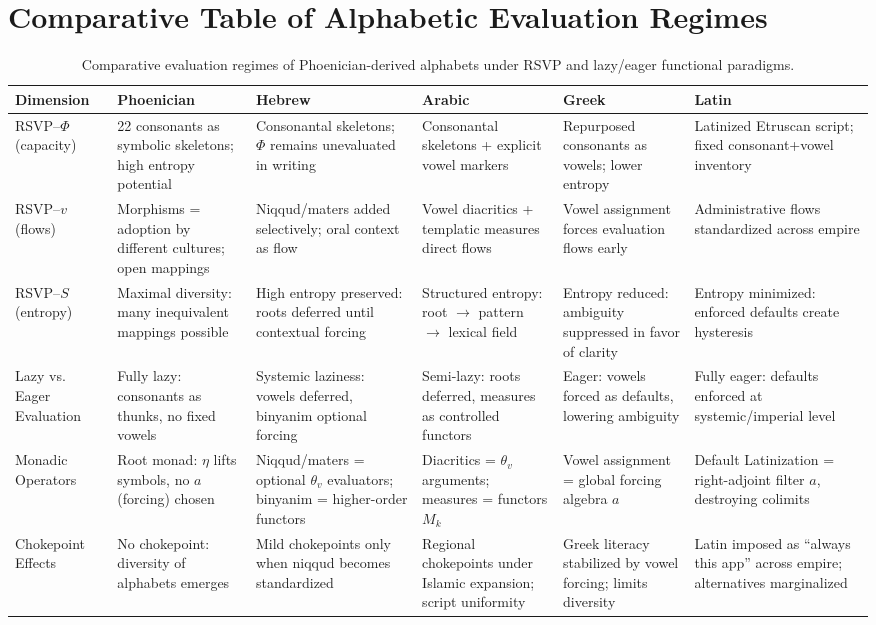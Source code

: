 \documentclass[12pt]{article}
\begin{document}
\section{Comparative Table of Alphabetic Evaluation Regimes}
\label{app:table}
\renewcommand{\arraystretch}{1.4}
\begin{table}[h!]
\centering
\begin{tabular}{l p{2.5cm} p{2.5cm} p{2.5cm} p{2.5cm} p{2.5cm}}
\toprule
Dimension & Phoenician & Hebrew & Arabic & Greek & Latin \\
\midrule
RSVP--$\Phi$ (capacity) & 22 consonants as symbolic skeletons; high entropy potential & Consonantal skeletons; $\Phi$ remains unevaluated in writing & Consonantal skeletons + explicit vowel markers & Repurposed consonants as vowels; lower entropy & Latinized Etruscan script; fixed consonant+vowel inventory \\
RSVP--$v$ (flows) & Morphisms = adoption by different cultures; open mappings & Niqqud/maters added selectively; oral context as flow & Vowel diacritics + templatic measures direct flows & Vowel assignment forces evaluation flows early & Administrative flows standardized across empire \\
RSVP--$S$ (entropy) & Maximal diversity: many inequivalent mappings possible & High entropy preserved: roots deferred until contextual forcing & Structured entropy: root $\to$ pattern $\to$ lexical field & Entropy reduced: ambiguity suppressed in favor of clarity & Entropy minimized: enforced defaults create hysteresis \\
Lazy vs. Eager Evaluation & Fully lazy: consonants as thunks, no fixed vowels & Systemic laziness: vowels deferred, binyanim optional forcing & Semi-lazy: roots deferred, measures as controlled functors & Eager: vowels forced as defaults, lowering ambiguity & Fully eager: defaults enforced at systemic/imperial level \\
Monadic Operators & Root monad: $\eta$ lifts symbols, no $a$ (forcing) chosen & Niqqud/maters = optional $\theta_v$ evaluators; binyanim = higher-order functors & Diacritics = $\theta_v$ arguments; measures = functors $M_k$ & Vowel assignment = global forcing algebra $a$ & Default Latinization = right-adjoint filter $a$, destroying colimits \\
Chokepoint Effects & No chokepoint: diversity of alphabets emerges & Mild chokepoints only when niqqud becomes standardized & Regional chokepoints under Islamic expansion; script uniformity & Greek literacy stabilized by vowel forcing; limits diversity & Latin imposed as ``always this app'' across empire; alternatives marginalized \\
\bottomrule
\end{tabular}
\caption{Comparative evaluation regimes of Phoenician-derived alphabets under RSVP and lazy/eager functional paradigms.}
\end{table}
\end{document}
